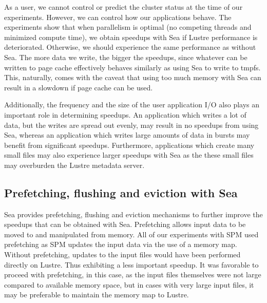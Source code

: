     As a user, we cannot control or predict the cluster status at the time of
    our experiments. However, we can control how our applications behave. The
    experiments show that when parallelism is optimal (no competing threads and
    minimized compute time), we obtain speedups with Sea if Lustre performance
    is deteriorated. Otherwise, we should experience the same performance as 
    without Sea. The more data we write, the bigger the speedups, since whatever
    can be written to page cache effectively behaves similarly as using Sea to write
    to tmpfs. This, naturally, comes with the caveat that using too much memory with
    Sea can result in a slowdown if page cache can be used.
    
    Additionally, the frequency and the size of the user application I/O also
    plays an important role in determining speedups. An application which writes
    a lot of data, but the writes are spread out evenly, may result in no
    speedups from using Sea, whereas an application which writes large amounts
    of data in bursts may benefit from significant speedups. Furthermore,
    applications which create many small files may also experience larger
    speedups with Sea as the these small files may overburden the Lustre
    metadata server.

    
    \subsection{Prefetching, flushing and eviction with Sea}

    Sea provides prefetching, flushing and eviction mechanisms to further improve
    the speedups that can be obtained with Sea. Prefetching allows input data to be moved
    to and manipulated from memory. All of our experiments with SPM used prefetching as
    SPM updates the input data via the use of a memory map. Without prefetching, updates
    to the input files would have been performed directly on Lustre. Thus exhibiting a
    less important speedup. It was favorable to proceed with prefetching, in this case,
    as the input files themselves were not large compared to available memory space, but
    in cases with very large input files, it may be preferable to maintain the memory map
    to Lustre.

